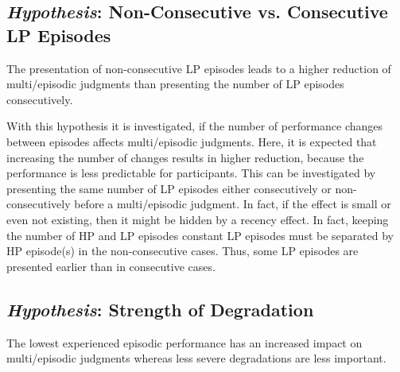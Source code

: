 \subsection[H3: Non-Consecutive vs. Consecutive \acs{LP} Episodes]{\emph{Hypothesis}: Non-Consecutive vs. Consecutive \acs{LP} Episodes}
\begin{hypothesis}\label{hypo:consecutive}
The presentation of non-consecutive \ac{LP} episodes leads to a higher reduction of multi\-/episodic judgments than presenting the number of \ac{LP} episodes consecutively.
\end{hypothesis}

With this hypothesis it is investigated, if the number of performance changes between episodes affects multi\-/episodic judgments.
Here, it is expected that increasing the number of changes results in higher reduction, because the performance is less predictable for participants.
This can be investigated by presenting the same number of \ac{LP} episodes either consecutively or non-consecutively before a multi\-/episodic judgment.
In fact, if the effect is small or even not existing, then it might be hidden by a recency effect.
In fact, keeping the number of \ac{HP} and \ac{LP} episodes constant \ac{LP} episodes must be separated by \ac{HP} episode(s) in the non-consecutive cases.
Thus, some \ac{LP} episodes are presented earlier than in consecutive cases.

\subsection[H4: Strength of Degradation]{\emph{Hypothesis}: Strength of Degradation}
\begin{hypothesis}\label{hypo:strength}
The lowest experienced episodic performance has an increased impact on multi\-/episodic judgments whereas less severe degradations are less important.
\end{hypothesis}

